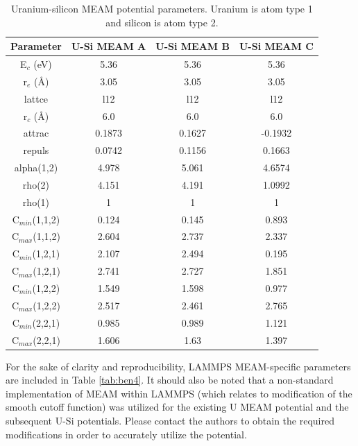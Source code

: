 \documentclass[review]{elsarticle}
\begin{document}
\begin{table}[h]
\caption{Uranium-silicon MEAM potential parameters.  Uranium is atom type 1 and silicon is atom type 2.}\label{tab:ben3}
\begin{center}
\begin{tabular}{|c|c|c|c|}
     \hline
     Parameter & U-Si MEAM A & U-Si MEAM B & U-Si MEAM C \\
     \hline
     E$_{c}$ (eV) & 5.36 & 5.36 & 5.36\\ 
     r$_{e}$ (\AA) & 3.05 & 3.05 & 3.05\\
     lattce & l12 & l12 & l12\\
     r$_{c}$ (\AA) & 6.0 & 6.0 & 6.0\\
     attrac & 0.1873 & 0.1627 & -0.1932 \\
     repuls & 0.0742 & 0.1156 & 0.1663 \\
     alpha(1,2) & 4.978 & 5.061 &4.6574 \\
     rho(2) & 4.151 & 4.191 & 1.0992\\
     rho(1) & 1 & 1 & 1\\
     C$_{min}$(1,1,2) & 0.124 & 0.145 & 0.893\\
     C$_{max}$(1,1,2) & 2.604 & 2.737 & 2.337\\
     C$_{min}$(1,2,1) & 2.107 & 2.494 & 0.195\\
     C$_{max}$(1,2,1) & 2.741 & 2.727 & 1.851\\
     C$_{min}$(1,2,2) & 1.549 & 1.598 & 0.977\\
     C$_{max}$(1,2,2) & 2.517 & 2.461 & 2.765\\
     C$_{min}$(2,2,1) & 0.985 & 0.989 & 1.121\\  
     C$_{max}$(2,2,1) & 1.606 & 1.63 & 1.397\\
     \hline
\end{tabular}
\end{center}
\label{default}
\end{table}%

For the sake of clarity and reproducibility, LAMMPS MEAM-specific parameters are included in Table \ref{tab:ben4}.  It should also be noted that a non-standard implementation of MEAM within LAMMPS (which relates to modification of the smooth cutoff function) was utilized for the existing U MEAM potential and the subsequent U-Si potentials.  Please contact the authors to obtain the required modifications in order to accurately utilize the potential.  
\end{document}
